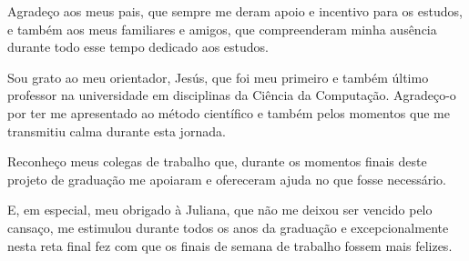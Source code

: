 \begin{agradecimentos}
    Agradeço aos meus pais, que sempre me deram apoio e incentivo para os estudos, e também aos meus familiares e amigos, que compreenderam minha ausência durante todo esse tempo dedicado aos estudos.
    
    Sou grato ao meu orientador, Jesús, que foi meu primeiro e também último professor na universidade em disciplinas da Ciência da Computação. Agradeço-o por ter me apresentado ao método científico e também pelos momentos que me transmitiu calma durante esta jornada.
    
    Reconheço meus colegas de trabalho que, durante os momentos finais deste projeto de graduação me apoiaram e ofereceram ajuda no que fosse necessário.

    E, em especial, meu obrigado à Juliana, que não me deixou ser vencido pelo cansaço, me estimulou durante todos os anos da graduação e excepcionalmente nesta reta final fez com que os finais de semana de trabalho fossem mais felizes.
\end{agradecimentos}
